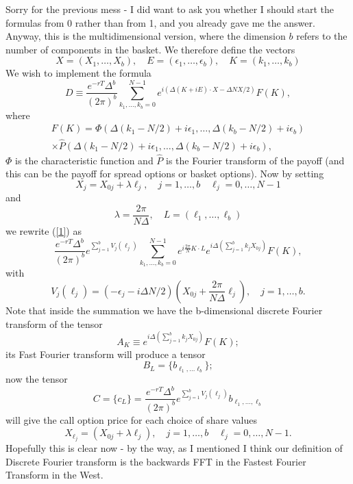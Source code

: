 \documentclass[10pt]{amsart}
\newcommand{\epo}{\epsilon_1}
\begin{document}
Sorry for the previous mess - I did want to ask you whether I should start the formulas from 0 rather than from 1, and you already gave me the answer. Anyway, this is the multidimensional version, where the
dimension $b$ refers to the number of components in the basket. We therefore
define the vectors
\[X=(X_1,\ldots,X_b),\quad E=(\epsilon_1,\ldots,\epsilon_b),\quad K=(k_1,\ldots,k_b)\]
We wish to implement the formula
\begin{equation}\label{1}D\equiv \frac{e^{-rT}\Delta^b}{(2\pi)^b}\sum_{k_1,\ldots,k_b=0}^{N-1}
e^{i\left(\Delta(K+iE)\cdot X-\Delta N X/2\right)}F(K),
\end{equation}
where
\begin{multline*}F(K)= 
\Phi\left(\Delta(k_1-N/2)+i\epo,\ldots,\Delta(k_b-N/2)+i\epsilon_b\right)\\ \times \widehat{P}
\left(\Delta(k_1-N/2)+i\epo,\ldots,\Delta(k_b-N/2)+i\epsilon_b\right),%
\end{multline*}
$\Phi$ is the characteristic function and $\widehat{P}$ is the Fourier transform of the payoff (and this can be the payoff for spread options or basket options).
Now by setting \[ X_j=X_{0j}+\lambda\ell_j,\quad j=1,\ldots,b\quad\ell_j=0,\ldots,N-1\]
and \[\lambda=\frac{2\pi}{N\Delta},\quad L=(\ell_1,\ldots,\ell_b)\]
 we rewrite (\ref{1}) as 
\begin{equation}\label{2}\frac{e^{-rT}\Delta^b}{(2\pi)^b} e^{\sum_{j=1}^bV_j(\ell_j)}
\sum_{k_1,\ldots,k_b=0}^{N-1}
e^{i\frac{2\pi}{N}K\cdot L}e^{i\Delta(\sum_{j=1}^b k_jX_{0j})}F(K),
\end{equation}
with
\[V_j(\ell_j)=\left(-\epsilon_j-i\Delta N/2\right)\left(X_{0j}+\frac{2\pi}{N\Delta}\ell_j\right),\quad j=1,\ldots,b.\] 
Note that inside the summation we have the b-dimensional discrete Fourier transform of the 
tensor \[A_{K}\equiv e^{i\Delta(\sum_{j=1}^b k_jX_{0j})}F(K);\]
its Fast Fourier transform will produce a tensor \[B_{L}=\{b_{\ell_1,\ldots \ell_b}\};\] 
now the tensor
\[C=\{c_{L}\}=\frac{e^{-rT}\Delta^b}{(2\pi)^b} e^{\sum_{j=1}^bV_j(\ell_j)}
b_{\ell_1,\ldots,\ell_b} \]
will give the call option price for each choice of share values
\[X_{\ell_j}=(X_{0j}+\lambda\ell_j),\quad j=1,\ldots,b\quad\ell_j=0,\ldots,N-1.\]
Hopefully this is clear now - by the way, as I mentioned I think our definition of Discrete Fourier
transform is the backwards FFT in the Fastest Fourier Transform in the West.
\end{document}
